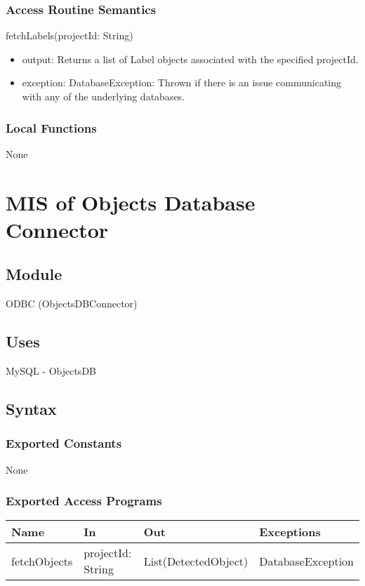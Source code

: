 \documentclass[12pt, titlepage]{article}
\begin{document}
\subsubsection{Access Routine Semantics}
    \noindent fetchLabels(projectId: String)
    \begin{itemize}
        \item output: Returns a list of Label objects associated with the specified projectId.
        \item exception: DatabaseException: Thrown if there is an issue communicating with any of the underlying databases.
    \end{itemize}

\subsubsection{Local Functions}
    None

\section{MIS of Objects Database Connector} \label{odbc} 
\subsection{Module}
    ODBC (ObjectsDBConnector)

\subsection{Uses}
    MySQL - ObjectsDB

\subsection{Syntax}
\subsubsection{Exported Constants}
    None

\subsubsection{Exported Access Programs}
\begin{center}\begin{tabular}{p{3cm} p{4cm} p{3cm} p{3cm}}
\hline\textbf{Name} & \textbf{In} & \textbf{Out} & \textbf{Exceptions} \\
\hline
    fetchObjects & projectId: String & List(DetectedObject) & DatabaseException \\
\hline
\end{tabular}\end{center}
\end{document}
